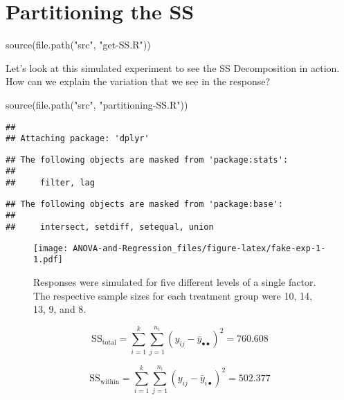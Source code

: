 \documentclass[
]{book}
\newenvironment{Shaded}{\begin{snugshade}}{\end{snugshade}}
\newcommand{\FunctionTok}[1]{\textcolor[rgb]{0.00,0.00,0.00}{#1}}
\newcommand{\NormalTok}[1]{#1}
\newcommand{\StringTok}[1]{\textcolor[rgb]{0.31,0.60,0.02}{#1}}
\begin{document}
\hypertarget{partitioning-the-ss}{%
\section{Partitioning the SS}\label{partitioning-the-ss}}

\begin{Shaded}
\begin{Highlighting}[]
\FunctionTok{source}\NormalTok{(}\FunctionTok{file.path}\NormalTok{(}\StringTok{"src"}\NormalTok{, }\StringTok{"get{-}SS.R"}\NormalTok{))}
\end{Highlighting}
\end{Shaded}

Let's look at this simulated experiment to see the SS Decomposition in action. How can we explain the variation that we see in the response?

\begin{Shaded}
\begin{Highlighting}[]
\FunctionTok{source}\NormalTok{(}\FunctionTok{file.path}\NormalTok{(}\StringTok{"src"}\NormalTok{, }\StringTok{"partitioning{-}SS.R"}\NormalTok{))}
\end{Highlighting}
\end{Shaded}

\begin{verbatim}
## 
## Attaching package: 'dplyr'
\end{verbatim}

\begin{verbatim}
## The following objects are masked from 'package:stats':
## 
##     filter, lag
\end{verbatim}

\begin{verbatim}
## The following objects are masked from 'package:base':
## 
##     intersect, setdiff, setequal, union
\end{verbatim}

\begin{figure}
\centering
\texttt{[image: ANOVA-and-Regression\_files/figure-latex/fake-exp-1-1.pdf]}
\caption{\label{fig:fake-exp-1}Responses were simulated for five different levels of a single factor. The respective sample sizes for each treatment group were 10, 14, 13, 9, and 8.}
\end{figure}

\[\text{SS}_{\text{total}} = \sum_{i=1}^{k} \sum_{j = 1}^{n_i} \left( y_{ij} - \bar{y}_{\bullet\bullet} \right)^2 = 760.608\]

\[\text{SS}_{\text{within}} = \sum_{i=1}^{k} \sum_{j = 1}^{n_i} \left(y_{ij} - \bar{y}_{i \bullet} \right)^2 = 502.377\]
\end{document}
